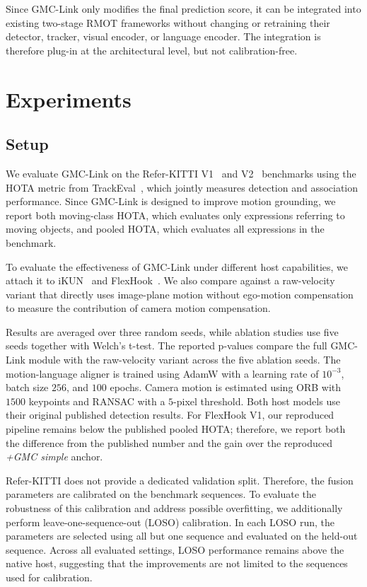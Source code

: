 \documentclass[sigconf,anonymous,nonacm]{acmart}
\begin{document}
Since GMC-Link only modifies the final prediction score, it can be integrated into existing two-stage RMOT frameworks without changing or retraining their detector, tracker, visual encoder, or language encoder. The integration is therefore plug-in at the architectural level, but not calibration-free.

\section{Experiments}
\label{sec:exp}

\subsection{Setup}
\label{sec:setup}

We evaluate GMC-Link on the Refer-KITTI V1~\cite{transrmot} and V2~\cite{temprmot} benchmarks using the HOTA metric from TrackEval~\cite{hota}, which jointly measures detection and association performance. Since GMC-Link is designed to improve motion grounding, we report both moving-class HOTA, which evaluates only expressions referring to moving objects, and pooled HOTA, which evaluates all expressions in the benchmark.

To evaluate the effectiveness of GMC-Link under different host capabilities, we attach it to iKUN~\cite{ikun} and FlexHook~\cite{flexhook}. We also compare against a raw-velocity variant that directly uses image-plane motion without ego-motion compensation to measure the contribution of camera motion compensation.

Results are averaged over three random seeds, while ablation studies use five seeds together with Welch's t-test. The reported p-values compare the full GMC-Link module with the raw-velocity variant across the five ablation seeds. The motion-language aligner is trained using AdamW with a learning rate of $10^{-3}$, batch size $256$, and $100$ epochs. Camera motion is estimated using ORB with $1500$ keypoints and RANSAC with a $5$-pixel threshold. Both host models use their original published detection results. For FlexHook V1, our reproduced pipeline remains below the published pooled HOTA; therefore, we report both the difference from the published number and the gain over the reproduced \emph{+GMC simple} anchor.

Refer-KITTI does not provide a dedicated validation split. Therefore, the fusion parameters are calibrated on the benchmark sequences. To evaluate the robustness of this calibration and address possible overfitting, we additionally perform leave-one-sequence-out (LOSO) calibration. In each LOSO run, the parameters are selected using all but one sequence and evaluated on the held-out sequence. Across all evaluated settings, LOSO performance remains above the native host, suggesting that the improvements are not limited to the sequences used for calibration.
\end{document}

